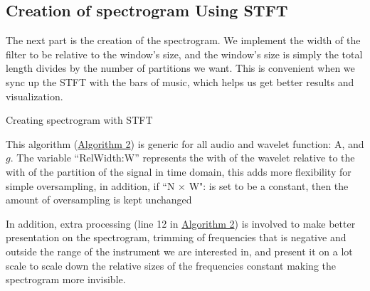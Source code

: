 \documentclass{article}
\begin{document}
    \subsection{Creation of spectrogram Using STFT}
        \par\hspace{1.1em}
        The next part is the creation of the spectrogram. We implement the width of the filter to be relative to the window's size, and the window's size is simply the total length divides by the number of partitions we want. This is convenient when we sync up the STFT with the bars of music, which helps us get better results and visualization.
        \begin{algorithm}\label{alg:2}
            \begin{algorithmic}[1]
                \ENDFOR
            \end{algorithmic}\caption{Creating spectrogram with STFT}
        \end{algorithm}
        \par
        This algorithm (\hyperref[alg:1]{Algorithm 2}) is generic for all audio and wavelet function: A, and $g$. The variable ``RelWidth:W'' represents the with of the wavelet relative to the with of the partition of the signal in time domain, this adds more flexibility for simple oversampling, in addition, if ``N $\times$ W": is set to be a constant, then the amount of oversampling is kept unchanged
        \par
        In addition, extra processing (line 12 in \hyperref[alg:2]{Algorithm 2}) is involved to make better presentation on the spectrogram, trimming of frequencies that is negative and outside the range of the instrument we are interested in, and present it on a lot scale to scale down the relative sizes of the frequencies constant making the spectrogram more invisible. 
\end{document}
